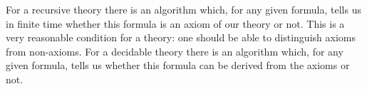 

\setcounter{section}{3}
\setcounter{subsection}{5}
\setcounter{dfn}{32}


For a recursive theory there is an algorithm which, for any given formula, tells us in finite time whether this formula is an axiom of our theory or not.
This is a very reasonable condition for a theory: one should be able to distinguish axioms from non-axioms.
For a decidable theory there is an algorithm which, for any given formula, tells us whether this formula can be derived from the axioms or not.


